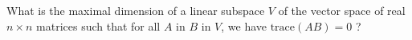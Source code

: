 What is the maximal dimension of a linear subspace $ V$ of the vector space of real $ n \times n$ matrices such that for all $ A$ in $ B$ in $ V$, we have $ \text{trace}\left(AB\right) = 0$ ?
